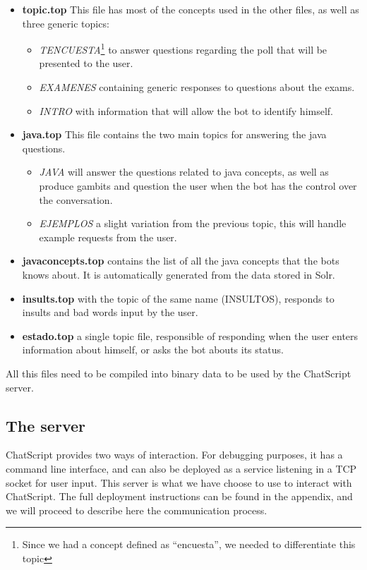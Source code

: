 \begin{itemize}
 \item \textbf{topic.top} This file has most of the concepts used in the other files, as well as three generic topics:
 \begin{itemize}
  \item \emph{TENCUESTA}\footnote{Since we had a concept defined as ``encuesta'', we needed to differentiate this topic} to answer questions regarding the poll that will be presented to the user.
  \item \emph{EXAMENES} containing generic responses to questions about the exams.
  \item \emph{INTRO} with information that will allow the bot to identify himself.
 \end{itemize}
 \item \textbf{java.top} This file contains the two main topics for answering the java questions.
 \begin{itemize}
  \item \emph{JAVA} will answer the questions related to java concepts, as well as produce gambits and question the user when the bot has the control over the conversation.
  \item \emph{EJEMPLOS} a slight variation from the previous topic, this will handle example requests from the user.
 \end{itemize}
 \item \textbf{javaconcepts.top} contains the list of all the java concepts that the bots knows about. It is automatically generated from the data stored in Solr.
 \item \textbf{insults.top} with the topic of the same name (INSULTOS), responds to insults and bad words input by the user.
 \item \textbf{estado.top} a single topic file, responsible of responding when the user enters information about himself, or asks the bot abouts its status.
\end{itemize}

All this files need to be compiled into binary data to be used by the ChatScript server.

\subsection{The server}
\label{sec:csserver}

ChatScript provides two ways of interaction. For debugging purposes, it has a command line interface, and can also be deployed as a service listening in a TCP socket for user input. This server is what we have choose to use to interact with ChatScript. The full deployment instructions can be found in the appendix, and we will proceed to describe here the communication process.

